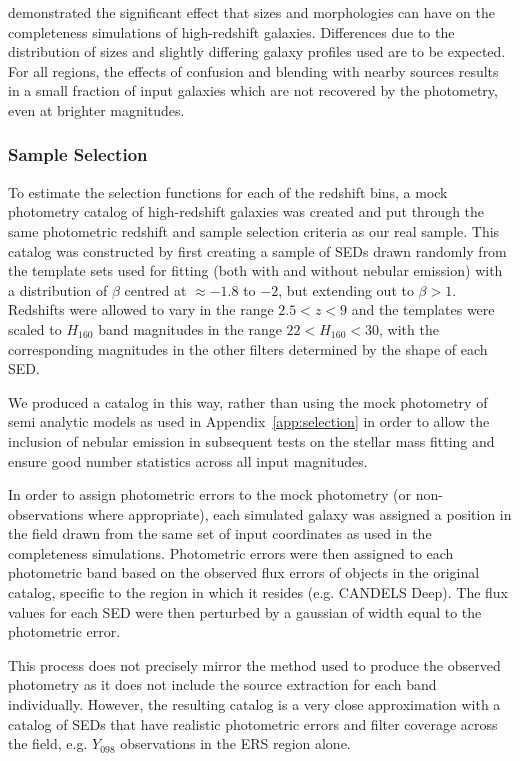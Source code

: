 \citet{2011A&A...532A..33G} demonstrated the significant effect that sizes and morphologies can have on the completeness simulations of high-redshift galaxies. Differences due to the distribution of sizes and slightly differing galaxy profiles used are to be expected. For all regions, the effects of confusion and blending with nearby sources results in a small fraction of input galaxies which are not recovered by the photometry, even at brighter magnitudes.

\subsubsection{Sample Selection}\label{sec:selection_sims}
To estimate the selection functions for each of the redshift bins, a mock photometry catalog of high-redshift galaxies was created and put through the same photometric redshift and sample selection criteria as our real sample. This catalog was constructed by first creating a sample of SEDs drawn randomly from the template sets used for fitting (both with and without nebular emission) with a distribution of $\beta$ centred at $\approx -1.8$ to $-2$, but extending out to $\beta > 1$. Redshifts were allowed to vary in the range $2.5 < z < 9$ and the templates were scaled to $H_{160}$ band magnitudes in the range $22 < H_{160} < 30$, with the corresponding magnitudes in the other filters determined by the shape of each SED.

We produced a catalog in this way, rather than using the mock photometry of semi analytic models as used in Appendix~\ref{app:selection} in order to allow the inclusion of nebular emission in subsequent tests on the stellar mass fitting and ensure good number statistics across all input magnitudes. 

In order to assign photometric errors to the mock photometry (or non-observations where appropriate), each simulated galaxy was assigned a position in the field drawn from the same set of input coordinates as used in the completeness simulations. Photometric errors were then assigned to each photometric band based on the observed flux errors of objects in the original catalog, specific to the region in which it resides (e.g. CANDELS Deep). The flux values for each SED were then perturbed by a gaussian of width equal to the photometric error.

This process does not precisely mirror the method used to produce the observed photometry as it does not include the source extraction for each band individually. However, the resulting catalog is a very close approximation with a catalog of SEDs that have realistic photometric errors and filter coverage across the field, e.g. $Y_{098}$ observations in the ERS region alone. 

